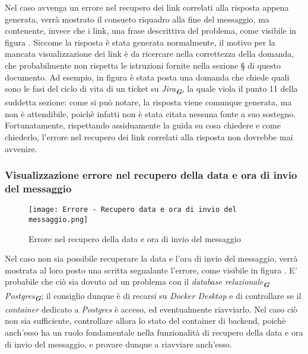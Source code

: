 Nel caso avvenga un errore nel recupero dei link correlati alla risposta appena generata, verrà mostrato il consueto riquadro alla fine del messaggio, ma contenente, invece che i link, una frase descrittiva del problema, come visibile in figura . Siccome la risposta è stata generata normalmente, il motivo per la mancata visualizzazione dei link è da ricercare nella correttezza della domanda, che probabilmente non rispetta le istruzioni fornite nella sezione \S{} di questo documento. Ad esempio, in figura è stata posta una domanda che chiede quali sono le fasi del ciclo di vita di un ticket su \emph{Jira}\textsubscript{\textbf{\textit{G}}}, la quale viola il punto 11 della suddetta sezione: come si può notare, la risposta viene comunque generata, ma non è attendibile, poichè infatti non è stata citata nessuna fonte a suo sostegno. Fortunatamente, rispettando assiduamente la guida su cosa chiedere e come chiederlo, l'errore nel recupero dei link correlati alla risposta non dovrebbe mai avvenire.


\subsubsection{Visualizzazione errore nel recupero della data e ora di invio del messaggio}

\begin{figure}[h]
    \centering
        \texttt{[image: Errore - Recupero data e ora di invio del messaggio.png]}
        \caption{Errore nel recupero della data e ora di invio del messaggio}
        \label{fig:Errore nel recupero della data e ora di invio del messaggio}
\end{figure}

Nel caso non sia possibile recuperare la data e l'ora di invio del messaggio, verrà mostrata al loro posto una scritta segnalante l'errore, come visibile in figura . E' probabile che ciò sia dovuto ad un problema con il \emph{database relazionale}\textsubscript{\textbf{\textit{G}}} \emph{Postgres}\textsubscript{\textbf{\textit{G}}}; il consiglio dunque è di recarsi su \emph{Docker Desktop} e di controllare se il \emph{container} dedicato a \emph{Postgres} è acceso, ed eventualmente riavviarlo. Nel caso ciò non sia sufficiente, controllare allora lo stato del container di backend, poichè anch'esso ha un ruolo fondamentale nella funzionalità di recupero della data e ora di invio del messaggio, e provare dunque a riavviare anch'esso.


